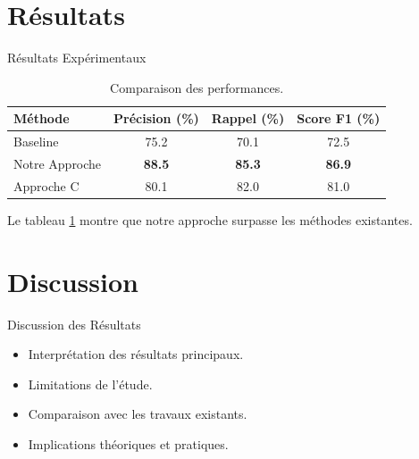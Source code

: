 \documentclass[aspectratio=169]{beamer} %
\begin{document}
\section{Résultats}

\begin{frame}{Résultats Expérimentaux}
  \begin{table}
    \centering
    \caption{Comparaison des performances.}
    \label{tab:resultats}
    \begin{tabular}{lccc}
      \toprule %
      Méthode     & Précision (\%) & Rappel (\%) & Score F1 (\%) \\
      \midrule %
      Baseline    & 75.2           & 70.1        & 72.5          \\
      Notre Approche & \textbf{88.5}  & \textbf{85.3} & \textbf{86.9} \\
      Approche C  & 80.1           & 82.0        & 81.0          \\
      \bottomrule %
    \end{tabular}
  \end{table}

  Le tableau \ref{tab:resultats} montre que notre approche surpasse les méthodes existantes.
\end{frame}

\section{Discussion}
\begin{frame}
    \centering
    \insertsectionhead
\end{frame}


\begin{frame}{Discussion des Résultats}
    \begin{itemize}
        \item Interprétation des résultats principaux.
        \item Limitations de l'étude.
        \item Comparaison avec les travaux existants.
        \item Implications théoriques et pratiques.
    \end{itemize}
\end{frame}
\end{document}
